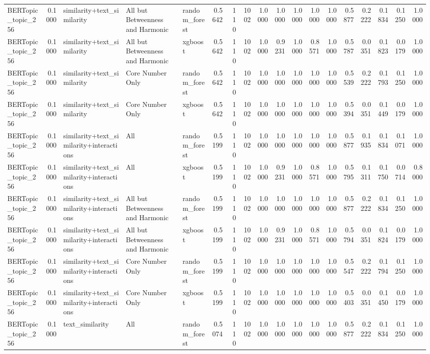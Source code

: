 \begin{tabular}{lrlllrrrrrrrrrrrrr}
BERTopic_topic_256 & 0.1000 & similarity+text_similarity & All but Betweenness and Harmonic & random_forest & 0.5642 & 110 & 1002 & 1.0000 & 1.0000 & 1.0000 & 1.0000 & 1.0000 & 0.5877 & 0.2222 & 0.1834 & 0.1250 & 1.0000 \\
BERTopic_topic_256 & 0.1000 & similarity+text_similarity & All but Betweenness and Harmonic & xgboost & 0.5642 & 110 & 1002 & 1.0000 & 0.9231 & 1.0000 & 0.8571 & 1.0000 & 0.5787 & 0.0351 & 0.1823 & 0.0179 & 1.0000 \\
BERTopic_topic_256 & 0.1000 & similarity+text_similarity & Core Number Only & random_forest & 0.5642 & 110 & 1002 & 1.0000 & 1.0000 & 1.0000 & 1.0000 & 1.0000 & 0.5539 & 0.2222 & 0.1793 & 0.1250 & 1.0000 \\
BERTopic_topic_256 & 0.1000 & similarity+text_similarity & Core Number Only & xgboost & 0.5642 & 110 & 1002 & 1.0000 & 1.0000 & 1.0000 & 1.0000 & 1.0000 & 0.5394 & 0.0351 & 0.1449 & 0.0179 & 1.0000 \\
BERTopic_topic_256 & 0.1000 & similarity+text_similarity+interactions & All & random_forest & 0.5199 & 110 & 1002 & 1.0000 & 1.0000 & 1.0000 & 1.0000 & 1.0000 & 0.5877 & 0.1935 & 0.1834 & 0.1071 & 1.0000 \\
BERTopic_topic_256 & 0.1000 & similarity+text_similarity+interactions & All & xgboost & 0.5199 & 110 & 1002 & 1.0000 & 0.9231 & 1.0000 & 0.8571 & 1.0000 & 0.5795 & 0.1311 & 0.1750 & 0.0714 & 0.8000 \\
BERTopic_topic_256 & 0.1000 & similarity+text_similarity+interactions & All but Betweenness and Harmonic & random_forest & 0.5199 & 110 & 1002 & 1.0000 & 1.0000 & 1.0000 & 1.0000 & 1.0000 & 0.5877 & 0.2222 & 0.1834 & 0.1250 & 1.0000 \\
BERTopic_topic_256 & 0.1000 & similarity+text_similarity+interactions & All but Betweenness and Harmonic & xgboost & 0.5199 & 110 & 1002 & 1.0000 & 0.9231 & 1.0000 & 0.8571 & 1.0000 & 0.5794 & 0.0351 & 0.1824 & 0.0179 & 1.0000 \\
BERTopic_topic_256 & 0.1000 & similarity+text_similarity+interactions & Core Number Only & random_forest & 0.5199 & 110 & 1002 & 1.0000 & 1.0000 & 1.0000 & 1.0000 & 1.0000 & 0.5547 & 0.2222 & 0.1794 & 0.1250 & 1.0000 \\
BERTopic_topic_256 & 0.1000 & similarity+text_similarity+interactions & Core Number Only & xgboost & 0.5199 & 110 & 1002 & 1.0000 & 1.0000 & 1.0000 & 1.0000 & 1.0000 & 0.5403 & 0.0351 & 0.1450 & 0.0179 & 1.0000 \\
BERTopic_topic_256 & 0.1000 & text_similarity & All & random_forest & 0.5074 & 110 & 1002 & 1.0000 & 1.0000 & 1.0000 & 1.0000 & 1.0000 & 0.5877 & 0.2222 & 0.1834 & 0.1250 & 1.0000 \\

\end{tabular}
